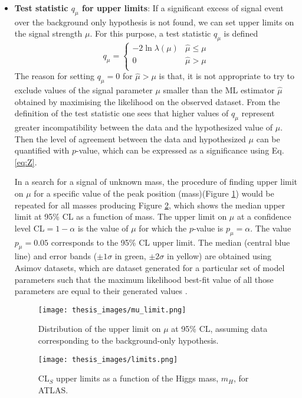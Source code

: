 \documentclass[a4paper, oneside, 11pt, openright]{book}
\begin{document}
\begin{itemize}
 				\item \textbf{Test statistic $q_\mu$ for upper limits}: If a significant excess of signal event over the background only hypothesis is not found, we can set upper limits on the signal strength $\mu$. For this purpose, a test statistic $q_\mu$ is defined
 				\begin{equation}\label{eq:q_mu_limit}
 					q_\mu = 
 					\begin{cases}
 						-2\ln\lambda(\mu) & \hat{\mu}\leq\mu \\
 						0 & \hat{\mu}>\mu \\
 					\end{cases}
 				\end{equation}
 				The reason for setting $q_\mu=0$ for $\hat{\mu}>\mu$ is that, it is not appropriate to try to exclude values of the signal parameter $\mu$ smaller than the ML estimator $\hat{\mu}$ obtained by maximising the likelihood on the observed dataset. From the definition of the test statistic one sees that higher values of $q_\mu$ represent greater incompatibility between the data and the hypothesized value of $\mu$. Then the level of agreement between the data and hypothesized $\mu$ can be quantified with $p$-value, which can be expressed as a significance using Eq. \ref{eq:Z}.
 				
 				In a search for a signal of unknown mass, the procedure of finding upper limit on $\mu$ for a specific value of the peak position (mass)(Figure \ref{fig:mu_limit}) would be repeated for all masses producing Figure \ref{fig:limits}, which shows the median upper limit at 95\% CL as a function of mass. The upper limit on $\mu$ at a confidence level CL$=1-\alpha$ is the value of $\mu$ for which the $p$-value is $p_\mu=\alpha$. The value $p_\mu = 0.05$ corresponds to the 95\% CL upper limit. The median (central blue line) and error bands ($\pm1\sigma$ in green, $\pm2\sigma$ in yellow) are obtained using Asimov datasets, which are dataset generated for a particular set of model parameters such that the maximum likelihood best-fit value of all those parameters are equal to their generated values \cite{Asimov}. 
 				\begin{figure}
 					\centering
 					\texttt{[image: thesis\_images/mu\_limit.png]}			
 					\caption{Distribution of the upper limit on $\mu$ at 95\% CL, assuming data corresponding to the background-only hypothesis.}
 					\label{fig:mu_limit}
 				\end{figure}
	 			\begin{figure}[!h]
	 				\centering
	 				\texttt{[image: thesis\_images/limits.png]}			
	 				\caption{CL$_S$ upper limits as a function of the Higgs mass, $m_H$, for ATLAS.}
	 				\label{fig:limits}
	 			\end{figure}
 			\end{itemize}
 			
\end{document}
